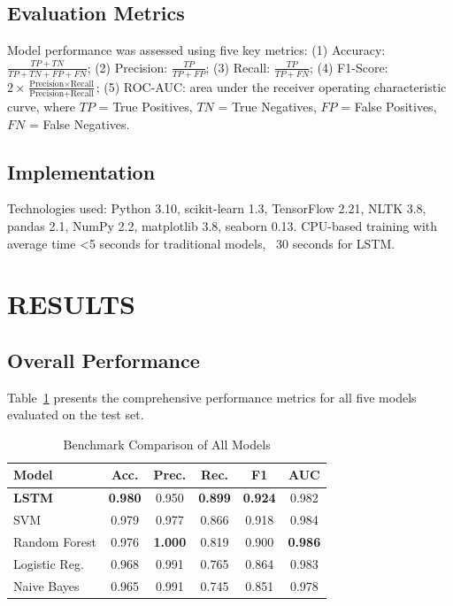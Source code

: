 \documentclass[a4paper,
               ]{jacow}
\begin{document}
\subsection{Evaluation Metrics}

Model performance was assessed using five key metrics: (1) Accuracy: $\frac{TP + TN}{TP + TN + FP + FN}$; (2) Precision: $\frac{TP}{TP + FP}$; (3) Recall: $\frac{TP}{TP + FN}$; (4) F1-Score: $2 \times \frac{\text{Precision} \times \text{Recall}}{\text{Precision} + \text{Recall}}$; (5) ROC-AUC: area under the receiver operating characteristic curve, where $TP$ = True Positives, $TN$ = True Negatives, $FP$ = False Positives, $FN$ = False Negatives.

\subsection{Implementation}

Technologies used: Python 3.10, scikit-learn 1.3, TensorFlow 2.21, NLTK 3.8, pandas 2.1, NumPy 2.2, matplotlib 3.8, seaborn 0.13. CPU-based training with average time <5 seconds for traditional models, ~30 seconds for LSTM.

\section{RESULTS}

\subsection{Overall Performance}

Table~\ref{tab:benchmark} presents the comprehensive performance metrics for all five models evaluated on the test set.

\begin{table}[!htb]
\centering
\caption{Benchmark Comparison of All Models}
\label{tab:benchmark}
\begin{tabular}{lccccc}
\toprule
\textbf{Model} & \textbf{Acc.} & \textbf{Prec.} & \textbf{Rec.} & \textbf{F1} & \textbf{AUC} \\
\midrule
\textbf{LSTM} & \textbf{0.980} & 0.950 & \textbf{0.899} & \textbf{0.924} & 0.982 \\
SVM & 0.979 & 0.977 & 0.866 & 0.918 & 0.984 \\
Random Forest & 0.976 & \textbf{1.000} & 0.819 & 0.900 & \textbf{0.986} \\
Logistic Reg. & 0.968 & 0.991 & 0.765 & 0.864 & 0.983 \\
Naive Bayes & 0.965 & 0.991 & 0.745 & 0.851 & 0.978 \\
\bottomrule
\end{tabular}
\end{table}
\end{document}
